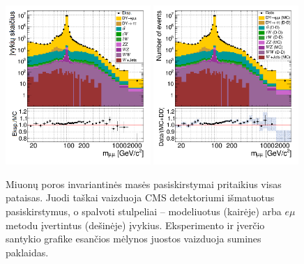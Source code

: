 \documentclass[a4paper, 12pt, oneside]{article}
\newcommand{\emu}{e\mu}
\begin{document}
\begin{figure}[H]
	\includegraphics[width=0.49\textwidth]{Kursinis3/mumu_mass_after.png}
	\includegraphics[width=0.49\textwidth]{Kursinis3/mumu_mass_wEMuEst.png}
	\caption{\label{fig:MassMCemu}
		Miuonų poros invariantinės masės pasiskirstymai pritaikius visas pataisas.
		Juodi taškai vaizduoja CMS detektoriumi išmatuotus pasiskirstymus, o spalvoti stulpeliai -- modeliuotus (kairėje)
		arba $\emu$ metodu įvertintus (dešinėje) įvykius.
		Eksperimento ir įverčio santykio grafike esančios mėlynos juostos vaizduoja sumines paklaidas.}
\end{figure}
\end{document}

